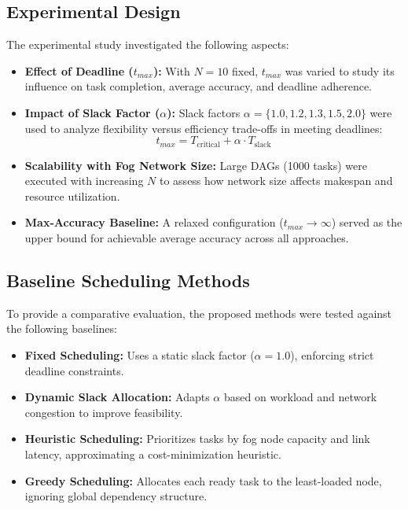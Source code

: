 \documentclass[conference]{IEEEtran}
\begin{document}
\subsection{Experimental Design}

The experimental study investigated the following aspects:
\begin{itemize}
    \item \textbf{Effect of Deadline ($t_{max}$):}  
    With $N=10$ fixed, $t_{max}$ was varied to study its influence on task completion, average accuracy, and deadline adherence.
    \item \textbf{Impact of Slack Factor ($\alpha$):}  
    Slack factors $\alpha = \{1.0, 1.2, 1.3, 1.5, 2.0\}$ were used to analyze flexibility versus efficiency trade-offs in meeting deadlines:
    \[
    t_{max} = T_{\text{critical}} + \alpha \cdot T_{\text{slack}}
    \]
    \item \textbf{Scalability with Fog Network Size:}  
    Large DAGs (1000 tasks) were executed with increasing $N$ to assess how network size affects makespan and resource utilization.
    \item \textbf{Max-Accuracy Baseline:}  
    A relaxed configuration ($t_{max} \to \infty$) served as the upper bound for achievable average accuracy across all approaches.
\end{itemize}

\subsection{Baseline Scheduling Methods}

To provide a comparative evaluation, the proposed methods were tested against the following baselines:
\begin{itemize}
    \item \textbf{Fixed Scheduling:}  
    Uses a static slack factor ($\alpha = 1.0$), enforcing strict deadline constraints.
    \item \textbf{Dynamic Slack Allocation:}  
    Adapts $\alpha$ based on workload and network congestion to improve feasibility.
    \item \textbf{Heuristic Scheduling:}  
    Prioritizes tasks by fog node capacity and link latency, approximating a cost-minimization heuristic.
    \item \textbf{Greedy Scheduling:}  
    Allocates each ready task to the least-loaded node, ignoring global dependency structure.
\end{itemize}
\end{document}
